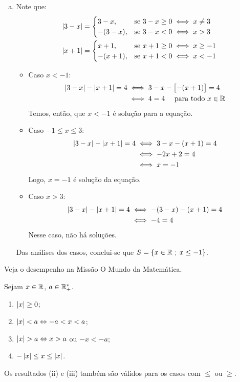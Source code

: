 \begin{solution}
\begin{enumerate}[(a)]
	\item Note que:
	\begin{align*}
		& \left|3-x\right|= 
		\begin{cases}
			3-x,    & \text{se } 3-x \ge 0 \iff x \ne 3 \\
			-(3-x), & \text{se } 3-x < 0 \iff x > 3
		\end{cases}\\
		& \left|x+1\right|= 
		\begin{cases}
			x+1,    & \text{se } x+1 \ge 0 \iff x \ge -1 \\
			-(x+1), & \text{se } x+1 < 0 \iff x < -1
		\end{cases}
	\end{align*}
	\begin{itemize}
		\item Caso $x<-1$: 
		\begin{align*}
			\left|3-x\right|-\left|x+1\right|=4 &\iff 3-x-\left[-(x+1)\right]=4\\
									&\iff 4=4 \ \ \ \text{ para todo } x \in \mathbb{R}
		\end{align*}
		Temos, então, que $x<-1$ é solução para a equação.
		\item Caso $-1 \le x \le 3$:
		\begin{align*}
			\left|3-x\right|-\left|x+1\right|=4 &\iff 3-x-(x+1)=4\\
									&\iff -2x+2=4\\
									&\iff x=-1
		\end{align*}
		Logo, $x=-1$ é solução da equação.
		\item Caso $x>3$:
		\begin{align*}
			\left|3-x\right|-\left|x+1\right|=4 &\iff -(3-x)-(x+1)=4\\
									&\iff -4=4
		\end{align*}
		Nesse caso, não há soluções.
	\end{itemize}

	Das análises dos casos, conclui-se que $S=\left\{ x \in \mathbb{R} \;;\; x \le -1\right\}$.
\end{enumerate}
\end{solution}

\begin{onlineact}
Veja o desempenho na Missão O Mundo da Matemática.
\end{onlineact}

\begin{proposition}
Sejam $x \in \mathbb{R}$, $a\in \mathbb{R}^*_+ $.
%
\begin{enumerate}
  \item $\left|x\right| \geq 0$;
  \item $\left|x\right| < a \Leftrightarrow -a < x < a$;
  \item $\left|x\right| > a \Leftrightarrow x > a$ ou $-x < -a$;
  \item $-\left|x\right| \leq x \leq \left|x\right|$.
\end{enumerate}
%
Os resultados (ii) e (iii) também são válidos para os casos com $\le$ ou $\ge$.
\end{proposition}

